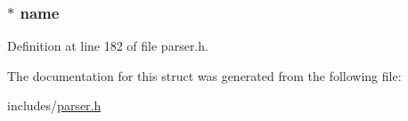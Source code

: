 \hypertarget{structvariable__reassignment__node_a0be25b04f38aae29e2dd7c1b72d4797c}{
\subsubsection[{name}]{$\ast$ name}}\label{structvariable__reassignment__node_a0be25b04f38aae29e2dd7c1b72d4797c}


Definition at line 182 of file parser.\+h.



The documentation for this struct was generated from the following file\+:\begin{DoxyCompactItemize}
\item 
includes/\hyperlink{parser_8h}{parser.\+h}\end{DoxyCompactItemize}
